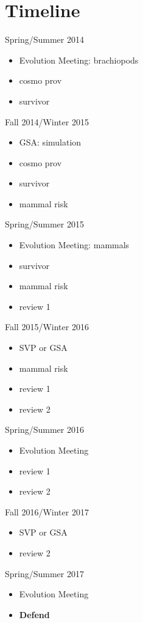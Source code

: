 \documentclass[12pt,letterpaper]{article}
\begin{document}
\clearpage
\section{Timeline}

Spring/Summer 2014
\begin{itemize}
  \item Evolution Meeting: brachiopods
  \item cosmo prov
  \item survivor
\end{itemize}

Fall 2014/Winter 2015
\begin{itemize}
  \item GSA: simulation
  \item cosmo prov
  \item survivor
  \item mammal risk
\end{itemize}

Spring/Summer 2015
\begin{itemize}
  \item Evolution Meeting: mammals
  \item survivor
  \item mammal risk
  \item review 1
\end{itemize}

Fall 2015/Winter 2016
\begin{itemize}
  \item SVP or GSA
  \item mammal risk
  \item review 1
  \item review 2
\end{itemize}

Spring/Summer 2016
\begin{itemize}
  \item Evolution Meeting
  \item review 1
  \item review 2
\end{itemize}

Fall 2016/Winter 2017
\begin{itemize}
  \item SVP or GSA
  \item review 2
\end{itemize}

Spring/Summer 2017
\begin{itemize}
  \item Evolution Meeting
  \item \textbf{Defend}
\end{itemize}



\clearpage


\end{document}
